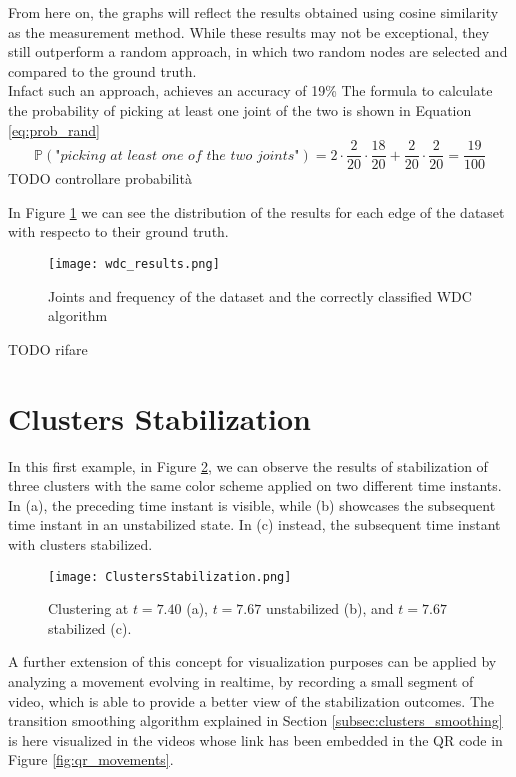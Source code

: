 From here on, the graphs will reflect the results obtained using cosine similarity as the measurement method.
While these results may not be exceptional, they still outperform a random approach, in which two random nodes are selected and compared to the ground truth. \\
Infact such an approach, achieves an accuracy of 19\% 
The formula to calculate the probability of picking at least one joint of the two is shown in Equation \ref{eq:prob_rand}
\begin{equation}
  \mathbb{P}(\textit{"picking at least one of the two joints"}) = 2 \cdot \frac{2}{20} \cdot \frac{18}{20} + \frac{2}{20} \cdot \frac{2}{20} = \frac{19}{100}
  \label{eq:prob_rand}
\end{equation}
TODO controllare probabilità

In Figure \ref{fig:wdc_results} we can see the distribution of the results for each edge of the dataset with respecto to their ground truth.
\begin{figure}[H]
  \centering
  \texttt{[image: wdc\_results.png]}
  \caption{Joints and frequency of the dataset and the correctly classified WDC algorithm}
  \label{fig:wdc_results}
\end{figure}
TODO rifare




\clearpage

\section{Clusters Stabilization}
In this first example, in Figure \ref{fig:stabilization_results}, we can observe the results of stabilization of three clusters with the same color scheme applied on two different time instants. 
In (a), the preceding time instant is visible, while (b) showcases the subsequent time instant in an unstabilized state. 
In (c) instead, the subsequent time instant with clusters stabilized.
\begin{figure}[H]
  \centering
  \texttt{[image: ClustersStabilization.png]}
  \caption{Clustering at $t=7.40$ (a), $t=7.67$ unstabilized (b), and $t=7.67$ stabilized (c).}
  \label{fig:stabilization_results}
\end{figure}

A further extension of this concept for visualization purposes can be applied by analyzing a movement evolving in realtime, by recording a small segment of video, which is able to provide a better view of the stabilization outcomes.
The transition smoothing algorithm explained in Section \ref{subsec:clusters_smoothing} is here visualized in the videos whose link has been embedded in the QR code in Figure \ref{fig:qr_movements}. \\

